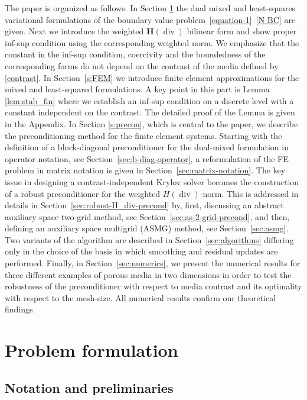 \documentclass[11pt]{amsart}
\numberwithin{equation}{section}
\theoremstyle{definition}\newtheorem{example}{Example}[section]
\begin{document}
The paper is organized as follows. In Section \ref{sec:problem} the dual mixed and 
least-squares variational formulations of the boundary value 
problem~\eqref{equation-1}--\eqref{N BC} are given.  Next we
introduce the weighted ${{\boldsymbol H}}({\operatorname{div}})$ bilinear form and show proper
inf-sup condition using the corresponding weighted norm. We emphasize
that the constant in the inf-sup condition, coercivity and the
boundedness of the corresponding forms do not depend on the contrast
of the media defined by \eqref{contrast}.
In Section~\ref{s:FEM} we introduce finite element approximations for the mixed and least-squared formulations. A key point in this part is Lemma \ref{lem:stab_fin}  
where we establish an inf-sup condition 
on a discrete level with a constant independent on the contrast. The detailed proof of the
Lemma is given in the Appendix. In Section \ref{s:precon}, which is central to the paper,
we describe the preconditioning method for the finite element  systems. 
Starting with the definition of a block-diagonal preconditioner for the dual-mixed formulation
in operator notation, see Section~\ref{sec:b-diag-operator}, a reformulation of the FE problem
in matrix notation is given in Section~\ref{sec:matrix-notation}.
The key issue in designing a contrast-independent Krylov solver becomes the construction
of a robust preconditioner for the weighted $H({\operatorname{div}})$-norm. This is addressed in 
details in Section~\ref{sec:robust-H_div-precond} by, first, discussing an abstract auxiliary
space two-grid method, see Section~\ref{sec:as-2-grid-precond}, and then, defining an
auxiliary space multigrid (ASMG) method, see Section~\ref{sec:asmg}. Two variants of the
algorithm are described in Section~\ref{sec:algorithms} differing only in the choice of the basis
in which smoothing and residual updates are performed. Finally, in Section~\ref{sec:numerics}, we 
present the numerical results for three different examples of porous media in two dimensions
in order to test the robustness of the preconditioner with respect to media contrast and its
optimality with respect to the mesh-size. All numerical results confirm our theoretical findings.

\section{Problem formulation}\label{sec:problem}

\subsection{Notation and preliminaries}
\end{document}
